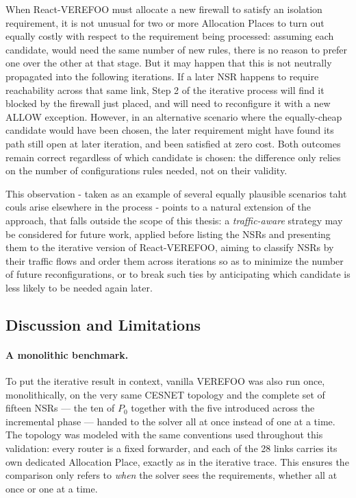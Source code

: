 When React-VEREFOO must allocate a new firewall to satisfy an isolation requirement, it is not unusual for two or more Allocation Places to turn out equally costly with respect to the requirement being processed: assuming each candidate, would need the same number of new rules, there is no reason to prefer one over the other at that stage. But it may happen that this is not neutrally propagated into the following iterations. If a later NSR happens to require reachability across that same link, Step 2 of the iterative process will find it blocked by the firewall just placed, and will need to reconfigure it with a new ALLOW exception. However, in an alternative scenario where the equally-cheap candidate would have been chosen, the later requirement might have found its path still open at later iteration, and been satisfied at zero cost. Both outcomes remain correct regardless of which candidate is chosen: the difference only relies on the number of configurations rules needed, not on their validity.

This observation - taken as an example of several equally plausible scenarios taht couls arise elsewhere in the process - points to a natural extension of the approach, that falls outside the scope of this thesis: a \emph{traffic-aware} strategy may be considered for future work, applied before listing the NSRs and presenting them to the iterative version of React-VEREFOO, aiming to classify NSRs by their traffic flows and order them across iterations so as to minimize the number of future reconfigurations, or to break such ties by anticipating which candidate is less likely to be needed again later.

\subsection{Discussion and Limitations}
\label{sec:discussion-limitations}

\paragraph{A monolithic benchmark.} To put the iterative result in context, vanilla VEREFOO was also run once, monolithically, on the very same CESNET topology and the complete set of fifteen NSRs — the ten of $P_0$ together with the five introduced across the incremental phase — handed to the solver all at once instead of one at a time. The topology was modeled with the same conventions used throughout this validation: every router is a fixed forwarder, and each of the 28 links carries its own dedicated Allocation Place, exactly as in the iterative trace. This ensures the comparison only refers to \emph{when} the solver sees the requirements, whether all at once or one at a time.

